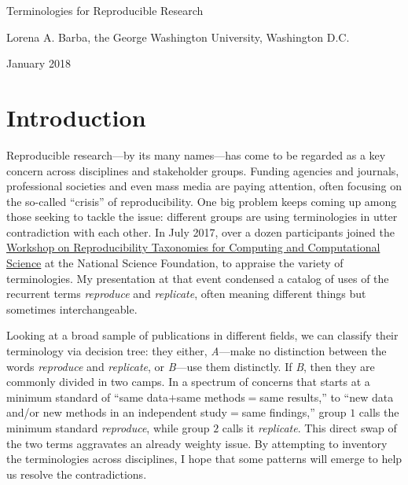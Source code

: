 \documentclass{statement}
\newlength{\up}
\begin{document}

\renewcommand{\thepage} {\arabic{page}}

\thispagestyle{empty}

{\titfont \Huge Terminologies for Reproducible Research} 
\medskip

{ Lorena A. Barba, the George Washington University, Washington D.C. 

January 2018}



\vspace{1cm}

\section*{Introduction}
\vspace{\up}

Reproducible research---by its many names---has come to be regarded as a key concern across disciplines and stakeholder groups. Funding agencies and journals, professional societies and even mass media are paying attention, often focusing on the so-called ``crisis'' of reproducibility. One big problem keeps coming up among those seeking to tackle the issue: different groups are using terminologies in utter contradiction with each other. 
In July 2017, over a dozen participants joined the \href{https://collegeville.github.io/repeto/ReproducibilityWorkshop2017.html}{Workshop on Reproducibility Taxonomies for Computing and Computational Science} at the National Science Foundation, to appraise the variety of terminologies.
My presentation at that event \cite[]{barba2017-repeto} condensed a catalog of uses of the recurrent terms \emph{reproduce} and \emph{replicate}, often meaning different things but sometimes interchangeable.

Looking at a broad sample of publications in different fields, we can classify their terminology via decision tree: they either, \emph{A}---make no distinction between the words \emph{reproduce} and \emph{replicate}, or \emph{B}---use them distinctly.  
If \emph{B}, then they are commonly divided in two camps. 
In a spectrum of concerns that starts at a minimum standard of ``same data$+$same methods$=$same results,'' to ``new data and/or new methods in an independent study$=$same findings,'' group $1$ calls the minimum standard \emph{reproduce}, while group $2$ calls it \emph{replicate}.
This direct swap of the two terms aggravates an already weighty issue.
By attempting to inventory the terminologies across disciplines, I hope that some patterns will emerge to help us resolve the contradictions.
\end{document}
